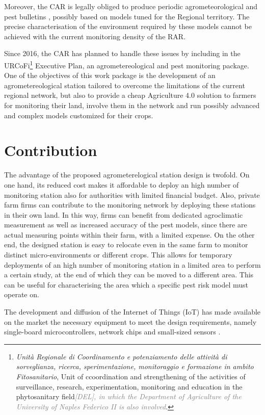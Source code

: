 \documentclass[conference]{IEEEtran}
\newcommand{\temp}[1]{\emph{\textcolor{gray}{#1}}}
\begin{document}
Moreover, the CAR is legally obliged to produce periodic agrometeorological and pest bulletins \cite{eu-directive:pesticide}, possibly based on models tuned for the Regional territory.
The precise characterisation of the environment required by these models cannot be achieved with the current monitoring density of the RAR. 

Since 2016, the CAR has planned to handle these issues by including in the URCoFi\footnote{\emph{Unità Regionale di Coordinamento e potenziamento delle attività di sorveglianza, ricerca, sperimentazione, monitoraggio e formazione in ambito Fitosanitario}, Unit of ccoordination and strengthening of the activities of surveillance, research, experimentation, monitoring and education in the phytosanitary field\temp{[DEL], in which the Department of Agriculture of the University of Naples Federico II is also involved}.} Executive Plan, an agrometereological and pest monitoring package. 
One of the objectives of this work package is the development of an agrometereological station tailored to overcome the limitations of the current regional network, but also to provide a cheap Agriculture 4.0 solution to farmers for monitoring their land, involve them in the network and run possibly advanced and complex models customized for their crops.

\section{Contribution}
The advantage of the proposed agrometerelogical station design is twofold. On one hand, its reduced cost makes it affordable to deploy an high number of monitoring station also for authorities with limited financial budget. 
Also, private farm firms can contribute to the monitoring network by deploying these stations in their own land.
In this way, firms can benefit from dedicated agroclimatic measurement as well as increased accuracy of the pest models, since there are actual measuring points within their farm, with a limited expense.
On the other end, the designed station is easy to relocate even in the same farm to monitor distinct micro-environments or different crops.
This allows for temporary deployments of an high number of monitoring station in a limited area to perform a certain study, at the end of which they can be moved to a different area. This can be useful for characterising the area which a specific pest risk model must operate on.

The development and diffusion of the Internet of Things (IoT) has made available on the market the necessary equipment to meet the design requirements, namely single-board microcontrollers, network chips and small-sized sensors \cite{singh:iot-devices}.
\end{document}
